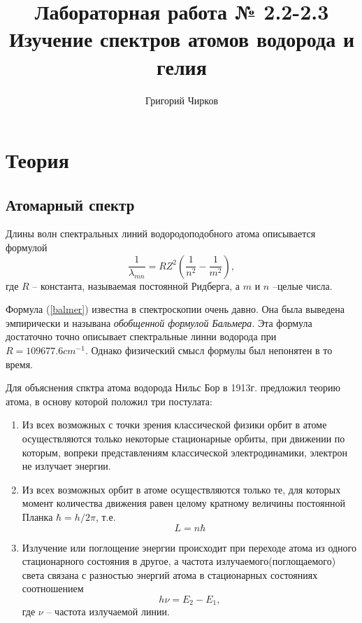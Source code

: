 \documentclass[12pt,a4paper]{article}
\author{Григорий Чирков}
\title{Лабораторная работа № 2.2-2.3 \\
		 Изучение спектров атомов водорода и гелия}
\begin{document}
\maketitle
\section{Теория}
\subsection{Атомарный спектр}
Длины волн спектральных линий водородоподобного атома описывается формулой 
\begin{equation} \label{balmer}
\frac{1}{\lambda_{mn}} = R Z^2 \left( \frac{1}{n^2} - \frac{1}{m^2} \right),
\end{equation}
где $R$ -- константа, называемая постоянной Ридберга, а $m$ и $n$ --целые числа.

Формула (\ref{balmer}) известна в спектроскопии очень давно. Она была выведена эмпирически и называна \textit{обобщенной формулой Бальмера}. Эта формула достаточно точно описывает спектральные линни водорода при $R = 109677.6 cm^{-1}$. Однако физический смысл формулы был непонятен в то время.

Для объяснения спктра атома водорода Нильс Бор в 1913г. предложил теорию атома, в основу которой положил три постулата:
\begin{enumerate}
\item Из всех возможных с точки зрения классической физики орбит в атоме осуществляются только некоторые стационарные орбиты, при движении по которым, вопреки представлениям классической электродинамики, электрон не излучает энергии.
\item Из всех возможных орбит в атоме осуществляются только те, для которых момент количества движения равен целому кратному величины постоянной Планка $\hbar  = h/2\pi$, т.е. 
\begin{equation}
L = n \hbar
\end{equation}
\item Излучение или поглощение энергии происходит при переходе атома из одного стационарного состояния в другое, а частота излучаемого(поглощаемого) света связана с разностью энергий атома в стационарных состояниях соотношением 
\begin{equation}
h \nu = E_2 - E_1,
\end{equation}
где $\nu$ -- частота излучаемой линии.
\end{enumerate}
\end{document}
